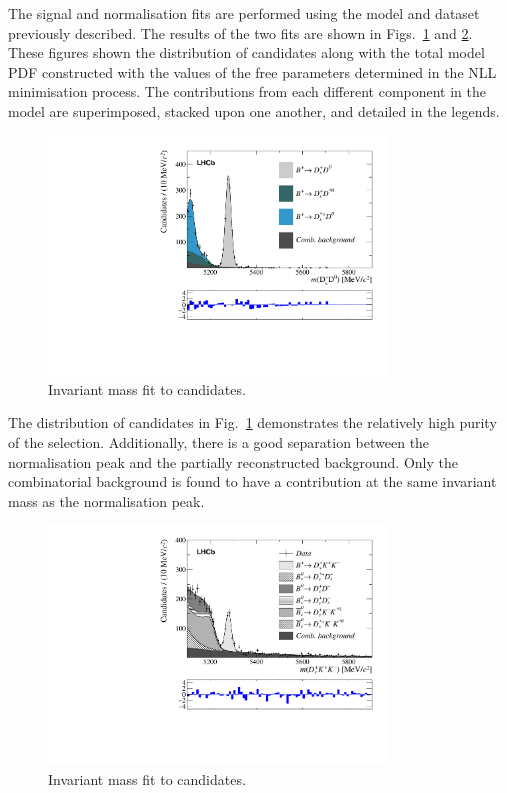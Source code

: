 The signal and normalisation fits are performed using the model and dataset previously described. The results of the two fits are shown in Figs.~\ref{fig:B2DsKK_fit_B2DsD0} and \ref{fig:B2DsKK_fit_B2DsKK}. These figures shown the distribution of \Bp candidates along with the total model PDF constructed with the values of the free parameters determined in the NLL minimisation process. The contributions from each different component in the model are superimposed, stacked upon one another, and detailed in the legends.

\begin{figure}[!h]
    \centering
    \includegraphics[width=0.8\textwidth]{figs/B2DsKK/Fit_DsD0.pdf}
    \caption{Invariant mass fit to \decay{\Bp}{\Dsp\Dzb} candidates.}
    \label{fig:B2DsKK_fit_B2DsD0}   
\end{figure}

The distribution of \decay{\Bp}{\Dsp\Dzb} candidates in Fig.~\ref{fig:B2DsKK_fit_B2DsD0} demonstrates the relatively high purity of the selection. Additionally, there is a good separation between the normalisation peak and the partially reconstructed background. Only the combinatorial background is found to have a contribution at the same invariant mass as the normalisation peak. 


\begin{figure}[!h]
    \centering
    \includegraphics[width=0.8\textwidth]{figs/B2DsKK/Fit_DsKK.pdf}
    \caption{Invariant mass fit to \decay{\Bp}{\Dsp\Kp\Km} candidates.}
    \label{fig:B2DsKK_fit_B2DsKK}   
\end{figure}

